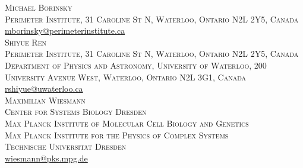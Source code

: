 \documentclass{article}
\numberwithin{theorem}{section}
\theoremstyle{remark}
\begin{document}
\printbibliography


\noindent 
\small
\textsc{Michael Borinsky}\\
\textsc{Perimeter Institute, 31 Caroline St N, Waterloo, Ontario N2L 2Y5, Canada}\\
\url{mborinsky@perimeterinstitute.ca}\medskip\\
\noindent
\textsc{Shiyue Ren}\\
\textsc{Perimeter Institute, 31 Caroline St N, Waterloo, Ontario N2L 2Y5, Canada}\\
\textsc{Department of Physics and Astronomy, University of Waterloo, 200 University Avenue West, Waterloo, Ontario N2L 3G1, Canada}\\
\url{rshiyue@uwaterloo.ca}\medskip\\
\noindent
\textsc{Maximilian Wiesmann}\\
\textsc{Center for Systems Biology Dresden}\\
\textsc{Max Planck Institute of Molecular Cell Biology and Genetics}\\
\textsc{Max Planck Institute for the Physics of Complex Systems}\\
\textsc{Technische Universität Dresden}\\
\url{wiesmann@pks.mpg.de}
\end{document}
